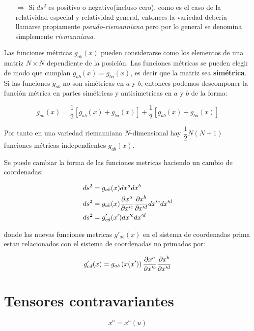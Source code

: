 \documentclass[../main]{subfiles}
\begin{document}
\begin{itemize}
    \item[$\Rightarrow$] Si $ds^2$ es positivo o negativo(incluso cero), como es el caso de la relatividad especial y relatividad general, entonces la variedad debería llamarse propiamente \textit{pseudo-riemanniana} pero por lo general se denomina simplemente \textit{riemanniana}.
\end{itemize}

Las funciones métricas $g_{ab}(x)$ pueden considerarse como los elementos de una matriz $N \times N$ dependiente de la posición. Las funciones métricas se pueden elegir de modo que cumplan $g_{ab}(x)=g_{ba}(x)$, es decir que la matriz sea \textbf{simétrica}. \\

Si las funciones $g_{ab}$ no son simétricas en $a$ y $b$, entonces podemos descomponer la función métrica en partes simétricas y antisimetricas en $a$ y $b$ de la forma:

\begin{equation}
    g_{ab}(x)=\dfrac{1}{2} \left[ g_{ab}(x)+g_{ba}(x) \right]+\dfrac{1}{2} \left[ g_{ab}(x)-g_{ba}(x) \right]
\end{equation}

Por tanto en una variedad riemanniana $N$-dimensional hay $\dfrac{1}{2}N(N+1)$ funciones métricas independientes $g_{ab}(x)$.

Se puede cambiar la forma de las funciones metricas haciendo un cambio de coordenadas:

\begin{align*}
    ds^2&=g_{ab}(x)dx^adx^b \\
    ds^2&=g_{ab}(x) \pdv{x^a}{x'^c} \pdv{x^b}{x'^d}dx'^c dx'^d \\
    ds^2&=g'_{cd}(x')dx'^cdx'^d
\end{align*}

donde las nuevas funciones metricas $g'_{ab}(x)$ en el sistema de coordenadas prima estan relacionados con el sistema de coordenadas no primados por:

\begin{equation}
    g'_{cd}(x)=g_{ab} \left( x(x') \right) \pdv{x^a}{x'^c} \pdv{x^b}{x'^d}
\end{equation}

\section{Tensores contravariantes}

\begin{equation*}
    x^a=x^a(u)
\end{equation*}
\end{document}
